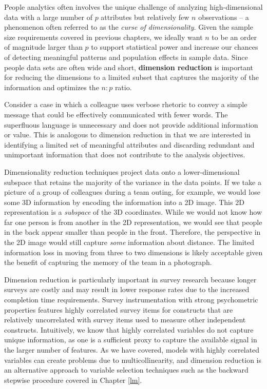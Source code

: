 \documentclass[
]{book}
\begin{document}
People analytics often involves the unique challenge of analyzing high-dimensional data with a large number of \(p\) attributes but relatively few \(n\) observations -- a phenomenon often referred to as the \emph{curse of dimensionality}. Given the sample size requirements covered in previous chapters, we ideally want \(n\) to be an order of magnitude larger than \(p\) to support statistical power and increase our chances of detecting meaningful patterns and population effects in sample data. Since people data sets are often wide and short, \textbf{dimension reduction} is important for reducing the dimensions to a limited subset that captures the majority of the information and optimizes the \(n:p\) ratio.

Consider a case in which a colleague uses verbose rhetoric to convey a simple message that could be effectively communicated with fewer words. The superfluous language is unnecessary and does not provide additional information or value. This is analogous to dimension reduction in that we are interested in identifying a limited set of meaningful attributes and discarding redundant and unimportant information that does not contribute to the analysis objectives.

Dimensionality reduction techniques project data onto a lower-dimensional subspace that retains the majority of the variance in the data points. If we take a picture of a group of colleagues during a team outing, for example, we would lose some 3D information by encoding the information into a 2D image. This 2D representation is a \emph{subspace} of the 3D coordinates. While we would not know how far one person is from another in the 2D representation, we would see that people in the back appear smaller than people in the front. Therefore, the perspective in the 2D image would still capture \emph{some} information about distance. The limited information loss in moving from three to two dimensions is likely acceptable given the benefit of capturing the memory of the team in a photograph.

Dimension reduction is particularly important in survey research because longer surveys are costly and may result in lower response rates due to the increased completion time requirements. Survey instrumentation with strong psychometric properties features highly correlated survey items for constructs that are relatively uncorrelated with survey items used to measure other independent constructs. Intuitively, we know that highly correlated variables do not capture unique information, as one is a sufficient proxy to capture the available signal in the larger number of features. As we have covered, models with highly correlated variables can create problems due to multicollinearity, and dimension reduction is an alternative approach to variable selection techniques such as the backward stepwise procedure covered in Chapter \ref{lm}.
\end{document}
